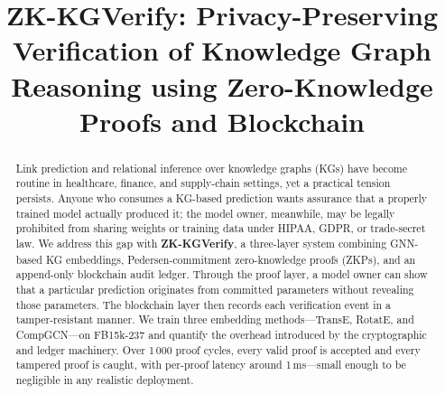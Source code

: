 \documentclass[conference, 10pt]{IEEEtran}
\begin{document}
\title{ZK-KGVerify: Privacy-Preserving Verification of Knowledge Graph Reasoning using Zero-Knowledge Proofs and Blockchain}


\author{
}


\maketitle

\begin{abstract}
Link prediction and relational inference over knowledge graphs (KGs) have become routine in healthcare, finance, and supply-chain settings, yet a practical tension persists. Anyone who consumes a KG-based prediction wants assurance that a properly trained model actually produced it; the model owner, meanwhile, may be legally prohibited from sharing weights or training data under HIPAA, GDPR, or trade-secret law. We address this gap with \textbf{ZK-KGVerify}, a three-layer system combining GNN-based KG embeddings, Pedersen-commitment zero-knowledge proofs (ZKPs), and an append-only blockchain audit ledger. Through the proof layer, a model owner can show that a particular prediction originates from committed parameters without revealing those parameters. The blockchain layer then records each verification event in a tamper-resistant manner. We train three embedding methods---TransE, RotatE, and CompGCN---on FB15k-237 and quantify the overhead introduced by the cryptographic and ledger machinery. Over 1\,000 proof cycles, every valid proof is accepted and every tampered proof is caught, with per-proof latency around 1\,ms---small enough to be negligible in any realistic deployment.
\end{abstract}
\end{document}

